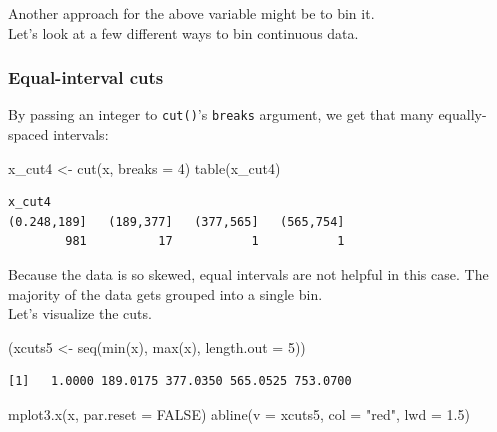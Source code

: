 \documentclass[
]{book}
\newenvironment{Shaded}{\begin{snugshade}}{\end{snugshade}}
\newcommand{\AttributeTok}[1]{\textcolor[rgb]{0.77,0.63,0.00}{#1}}
\newcommand{\ConstantTok}[1]{\textcolor[rgb]{0.00,0.00,0.00}{#1}}
\newcommand{\DecValTok}[1]{\textcolor[rgb]{0.00,0.00,0.81}{#1}}
\newcommand{\FloatTok}[1]{\textcolor[rgb]{0.00,0.00,0.81}{#1}}
\newcommand{\FunctionTok}[1]{\textcolor[rgb]{0.00,0.00,0.00}{#1}}
\newcommand{\NormalTok}[1]{#1}
\newcommand{\OtherTok}[1]{\textcolor[rgb]{0.56,0.35,0.01}{#1}}
\newcommand{\StringTok}[1]{\textcolor[rgb]{0.31,0.60,0.02}{#1}}
\begin{document}
Another approach for the above variable might be to bin it.\\
Let's look at a few different ways to bin continuous data.

\hypertarget{equal-interval-cuts}{%
\subsubsection{Equal-interval cuts}\label{equal-interval-cuts}}

By passing an integer to \texttt{cut()}'s \texttt{breaks} argument, we get that many equally-spaced intervals:

\begin{Shaded}
\begin{Highlighting}[]
\NormalTok{x\_cut4 }\OtherTok{\textless{}{-}} \FunctionTok{cut}\NormalTok{(x, }\AttributeTok{breaks =} \DecValTok{4}\NormalTok{)}
\FunctionTok{table}\NormalTok{(x\_cut4)}
\end{Highlighting}
\end{Shaded}

\begin{verbatim}
x_cut4
(0.248,189]   (189,377]   (377,565]   (565,754] 
        981          17           1           1 
\end{verbatim}

Because the data is so skewed, equal intervals are not helpful in this case. The majority of the data gets grouped into a single bin.\\
Let's visualize the cuts.

\begin{Shaded}
\begin{Highlighting}[]
\NormalTok{(xcuts5 }\OtherTok{\textless{}{-}} \FunctionTok{seq}\NormalTok{(}\FunctionTok{min}\NormalTok{(x), }\FunctionTok{max}\NormalTok{(x), }\AttributeTok{length.out =} \DecValTok{5}\NormalTok{))}
\end{Highlighting}
\end{Shaded}

\begin{verbatim}
[1]   1.0000 189.0175 377.0350 565.0525 753.0700
\end{verbatim}

\begin{Shaded}
\begin{Highlighting}[]
\FunctionTok{mplot3.x}\NormalTok{(x, }\AttributeTok{par.reset =} \ConstantTok{FALSE}\NormalTok{)}
\FunctionTok{abline}\NormalTok{(}\AttributeTok{v =}\NormalTok{ xcuts5, }\AttributeTok{col =} \StringTok{"red"}\NormalTok{, }\AttributeTok{lwd =} \FloatTok{1.5}\NormalTok{)}
\end{Highlighting}
\end{Shaded}
\end{document}
